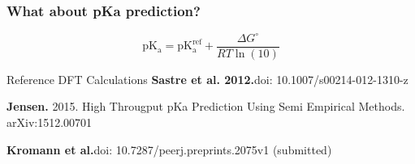 \begin{frame}[fragile]
    \frametitle{What about pKa prediction?}

    \begin{equation*}
    \mathrm{pK_a}=\mathrm{pK_a^{ref}} + \frac{\Delta G^\circ}{RT\ln (10)} 
    \end{equation*}

    \bigskip

    Reference DFT Calculations\newline
    {\bf Sastre et al. 2012.}\newline doi: 10.1007/s00214-012-1310-z

    \bigskip

    {\bf Jensen.} 2015. High Througput pKa Prediction Using Semi Empirical Methods. arXiv:1512.00701

    \bigskip

    {\bf Kromann et al.}\newline doi: 10.7287/peerj.preprints.2075v1 (submitted)



\end{frame}


